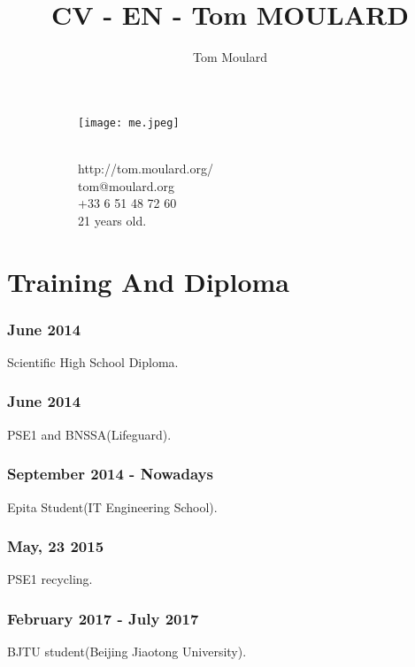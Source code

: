 \documentclass{article}
\begin{document}
    \title{CV - EN - Tom MOULARD}

    \author{Tom Moulard}


    \begin{center}
        \begin{figure}
            \centering
            \begin{subfigure}[b]{0.3\textwidth}
                \texttt{[image: me.jpeg]}
            \end{subfigure}
            \begin{subfigure}[b]{0.3\textwidth}
                {\huge\bfseries\theauthor}\\
                \vspace{.25em}
                http://tom.moulard.org/\\
                tom@moulard.org\\
                +33 6 51 48 72 60\\
                21 years old.
            \end{subfigure}
        \end{figure}
    \end{center}

    \section{Training And Diploma}
        \subsubsection{June 2014}
            Scientific High School Diploma.
        \subsubsection{June 2014}
            PSE1 and BNSSA(Lifeguard).
        \subsubsection{September 2014 - Nowadays}
            Epita Student(IT Engineering School).
        \subsubsection{May, 23 2015}
            PSE1 recycling.
        \subsubsection{February 2017 - July 2017}
            BJTU student(Beijing Jiaotong University).
\end{document}
